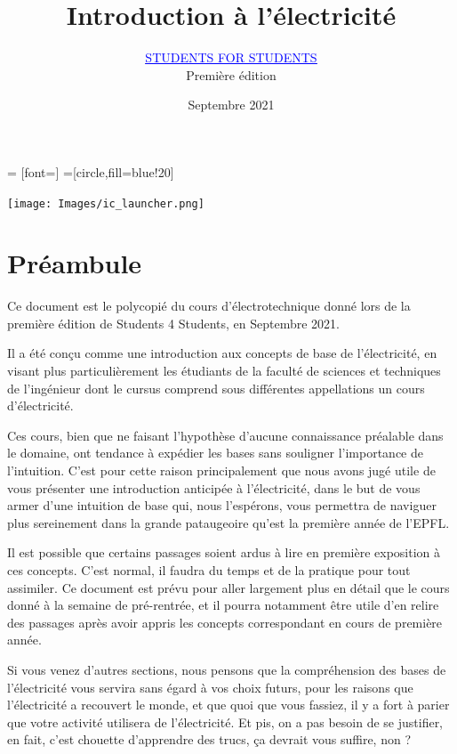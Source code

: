 \documentclass{article}
\title{Introduction à l'électricité}
\author{\href{https://s4s.fun}{\textcolor{blue}{\underline{STUDENTS FOR STUDENTS}}}\\Première édition}
\date{Septembre 2021}
\begin{document}
 = [font=\scriptsize]  
=[circle,fill=blue!20]


\maketitle
\vspace{6\baselineskip}
\begin{center}
   \texttt{[image: Images/ic\_launcher.png]} 
\end{center}

\newpage
\hfill
\newpage

{
\setlength{\parskip}{1ex}

\section*{Préambule}

Ce document est le polycopié du cours d'électrotechnique donné lors de la première édition de Students 4 Students, en Septembre 2021.

Il a été conçu comme une introduction aux concepts de base de l'électricité, en visant plus particulièrement les étudiants de la faculté de sciences et techniques de l'ingénieur dont le cursus comprend sous différentes appellations un cours d'électricité.

Ces cours, bien que ne faisant l'hypothèse d'aucune connaissance préalable dans le domaine, ont tendance à expédier les bases sans souligner l'importance de l'intuition. C'est pour cette raison principalement que nous avons jugé utile de vous présenter une introduction anticipée à l'électricité, dans le but de vous armer d'une intuition de base qui, nous l'espérons, vous permettra de naviguer plus sereinement dans la grande pataugeoire qu'est la première année de l'EPFL.

Il est possible que certains passages soient ardus à lire en première exposition à ces concepts. C'est normal, il faudra du temps et de la pratique pour tout assimiler. Ce document est prévu pour aller largement plus en détail que le cours donné à la semaine de pré-rentrée, et il pourra notamment être utile d'en relire des passages après avoir appris les concepts correspondant en cours de première année.

Si vous venez d'autres sections, nous pensons que la compréhension des bases de l'électricité vous servira sans égard à vos choix futurs, pour les raisons que l'électricité a recouvert le monde, et que quoi que vous fassiez, il y a fort à parier que votre activité utilisera de l'électricité. Et pis, on a pas besoin de se justifier, en fait, c'est chouette d'apprendre des trucs, ça devrait vous suffire, non ?
}
\end{document}

